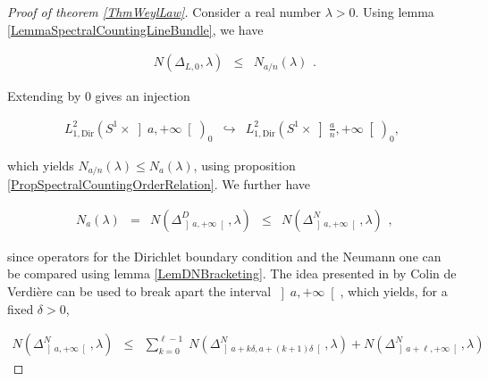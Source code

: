 \documentclass{jams-l}
\theoremstyle{definition}
\theoremstyle{remark}
\numberwithin{equation}{section}
\begin{document}
        \begin{proof}[Proof of theorem \ref{ThmWeylLaw}]
        
            Consider a real number $\lambda > 0$. Using lemma \ref{LemmaSpectralCountingLineBundle}, we have
            
            \[ \begin{array}{lll}
                    N \left( \Delta_{L,0}, \lambda \right) & \leqslant & N_{a/n} \left( \lambda \right)
                \end{array} . \]
                
            \noindent Extending by $0$ gives an injection
            
            
            \[ \begin{array}{lll}
                    L_{1, \mathrm{Dir}}^2 \left( S^1 \times \left] a, +\infty \right[ \right)_0 & \hookrightarrow & L_{1, \mathrm{Dir}}^2 \left( S^1 \times \left] \frac{a}{n}, +\infty \right[ \right)_0,
                \end{array} \]
            
            \noindent which yields $N_{a/n} \left( \lambda \right) \leqslant N_a \left( \lambda \right)$, using proposition \ref{PropSpectralCountingOrderRelation}. We further have
            
            \[ \begin{array}{lllll}
                    N_a \left( \lambda \right) & = & N \left( \Delta^D_{\left] a, + \infty \right[}, \lambda \right) & \leqslant & N \left( \Delta^N_{\left] a, + \infty \right[}, \lambda \right)
                \end{array} , \]
            
            \noindent since operators for the Dirichlet boundary condition and the Neumann one can be compared using lemma \ref{LemDNBracketing}. The idea presented in \cite[Thm 6]{MR699488} by Colin de Verdière can be used to break apart the interval $\left] a, +\infty \right[$, which yields, for a fixed $\delta > 0$,
            
            \[ \begin{array}{lll}
                    N \left( \Delta^N_{\left] a, + \infty \right[}, \lambda \right) & \leqslant & \sum\limits_{k=0}^{\ell - 1} \; N \left( \Delta^N_{\left] a+k \delta, a+\left( k+1 \right) \delta \right[}, \lambda \right) + N \left( \Delta^N_{\left] a + \ell, + \infty \right[}, \lambda \right)
                \end{array} \]
            

\end{proof}
\end{document}
